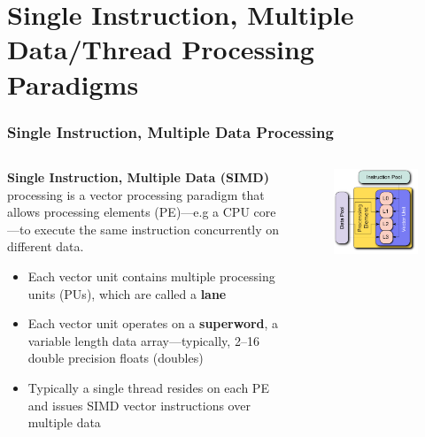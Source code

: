 \documentclass{beamer}
\newcounter{dummynote1}%
\newcounter{dummynote2}%
\begin{document}
\section{Single Instruction, Multiple Data\slash Thread Processing Paradigms}

\begin{frame}
 \frametitle{Single Instruction, Multiple Data Processing}
 \setcounter{dummynote1}{\value{footnote}}
 \addtocounter{dummynote1}{1}
 \begin{columns}
 \begin{column}{0.6\textwidth}
  \textbf{Single Instruction, Multiple Data (SIMD)} processing is a vector processing paradigm that allows processing elements (PE)---e.g a CPU core---to execute the same instruction concurrently on different data.
  \begin{itemize}
    \item Each vector unit contains multiple processing units (PUs), which are called a \textbf{lane}
    \item Each vector unit operates on a \textbf{superword}, a variable length data array---typically, \numrange{2}{16} double precision floats (doubles)
    \item Typically a single thread resides on each PE and issues SIMD vector instructions over multiple data
  \end{itemize}
 \end{column}
 \begin{column}{0.4\textwidth}
  \begin{figure}
    \centering
    \includegraphics[width=\columnwidth]{SIMD.pdf}

\end{figure}
\end{column}
\end{columns}
\end{frame}
\end{document}
